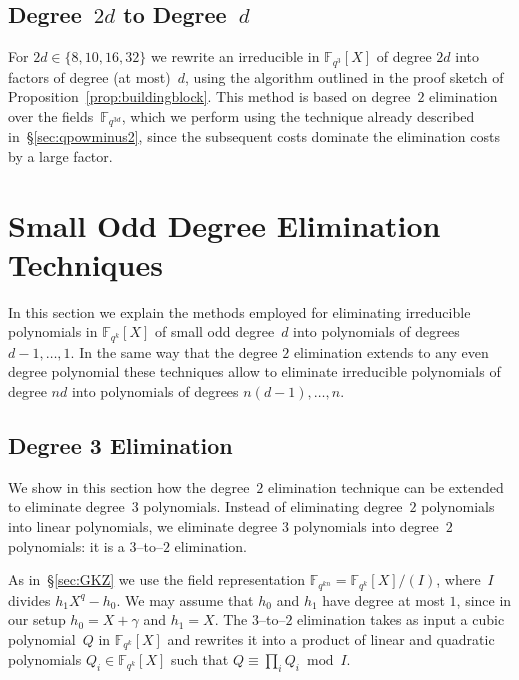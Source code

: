 \documentclass[11pt]{llncs}
\newcommand{\F}{\mathbb F}
\begin{document}
\subsection{Degree~$2d$ to Degree~$d$}

For $2d \in \{8,10,16,32\}$ we rewrite an irreducible in $\F_{q^3}[X]$ of degree $2d$ into factors of degree (at most)~$d$, using the
algorithm outlined in the proof sketch of Proposition~\ref{prop:buildingblock}. This method is based on degree~$2$ elimination over the 
fields~$\F_{q^{3d}}$, which we perform using the technique already described in~\S\ref{sec:qpowminus2}, since the subsequent costs dominate 
the elimination costs by a large factor.


\section{Small Odd Degree Elimination Techniques}\label{sec:smallodd}

In this section we explain the methods employed for eliminating irreducible polynomials in $\F_{q^k}[X]$ of small odd degree~$d$ into polynomials of
degrees $d \!-\! 1, \dots, 1$.
In the same way that the degree $2$ elimination extends to any even degree
polynomial these techniques allow to eliminate irreducible polynomials of
degree $nd$ into polynomials of degrees $n (d \!-\! 1), \dots, n$.


\subsection{Degree 3 Elimination}

We show in this section how the degree~$2$ elimination technique can be extended to eliminate degree~$3$ polynomials. Instead of eliminating degree~$2$ polynomials into linear polynomials, we eliminate degree $3$ polynomials into degree~$2$ polynomials: it is a $3$--to--$2$ elimination.

As in~\S\ref{sec:GKZ} we use the field representation $\F_{q^{kn}} = \F_{q^k}[X] / (I)$, where~$I$ divides $h_1 X^q - h_0$.
We may assume that $h_0$ and $h_1$ have degree at most $1$, since in our setup $h_0 = X + \gamma$ and $h_1 = X$.
The $3$--to--$2$ elimination takes as input a cubic polynomial~$Q$ in $\F_{q^k}[X]$ and rewrites it into a product of linear and quadratic polynomials $Q_i \in \F_{q^k}[X]$ such that $Q \equiv \prod_i Q_i \bmod I$.
\end{document}
